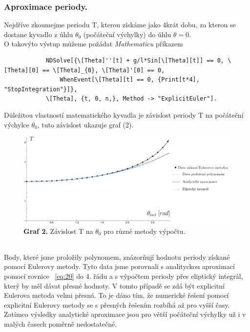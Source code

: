 \documentclass[reqno, a4paper]{amsart}
\begin{document}
		\subsubsection{Aproximace periody.} Nejdříve zkoumejme periodu T, kterou získáme jako 4krát dobu, za kterou se dostane kyvadlo z úhlu $\theta_{0}$ (počáteční výchylky) do úhlu $\theta=0$. 
		\\
		O takovýto výstup můžeme požádat \textit{Mathematicu} příkazem
		\begin{verbatim}
			NDSolve[{\[Theta]''[t] + g/l*Sin[\[Theta][t]] == 0, \[Theta][0] == \[Theta]_{0}, \[Theta]'[0] == 0, 
				WhenEvent[\[Theta][t] == 0, {Print[t*4], "StopIntegration"}]}, 
			\[Theta], {t, 0, n,}, Method -> "ExplicitEuler"].
		\end{verbatim}
		Důležitou vlastností matematického kyvadla je závislost periody T na počáteční výchylce $\theta_{0}$, tuto závislost ukazuje graf (2).
		\begin{figure}[h]
			\centering
			\includegraphics[width=0.99\textwidth]{graf1}
			\caption*{\textbf{Graf 2.} Závislost T na $\theta_{0}$ pro různé metody výpočtu.}  
		\end{figure}
		\\
		Body, které jsme proložily polynomem, znázorňují hodnotu periody získané pomocí Eulerovy metody. Tyto data jsme porovnali s analityckou aproximací pomocí rovnice ~\eqref{eq:20} do 4. řádu a s výpočtem periody přes eliptický integrál, který by měl dávat přesné hodnoty.
		V tomto případě se zdá být explicitní Eulerova metoda velmi přesná. To je dáno tím, že numerické řešení pomocí explicitní Eulerovy metody se s přesných řešením rozbíhá až pro vyšší časy. Zatímco výsledky analytické aproximace jsou pro větší počáteční výchylky už i v malých časech poměrně nedostatečné.
\end{document}
